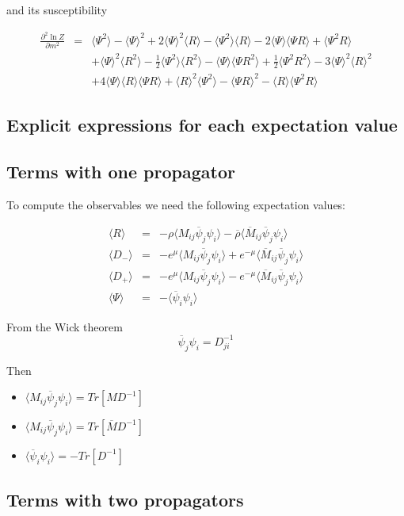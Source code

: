 \documentclass[a4paper,10pt]{report}
\newcommand{\ol}[1]{\overline{#1}}
\newcommand{\rrb}{\overline{\rho}}
\newcommand{\rr}{\rho}
\newcommand{\emu}{e^{\mu}}
\newcommand{\emmu}{e^{-\mu}}
\newcommand{\Mb}{\ol{M}}
\newcommand{\mv}[1]{\langle #1 \rangle}
\newcommand{\pij}[2]{\ol{\psi}_{#1} \psi_{#2}}
\newcommand{\D}{D^{-1}}
\begin{document}
\noindent and its susceptibility

\begin{eqnarray}
\frac{\partial^2 \ln Z}{\partial m^2} &=& 
  \mv{\Psi^2} - \mv{\Psi}^2 + 2 \mv{\Psi}^2\mv{R} - \mv{\Psi^2}\mv{R} 
  - 2 \mv{\Psi}\mv{\Psi R} + \mv{\Psi^2 R} \nonumber \\
  && + \mv{\Psi}^2\mv{R^2} - \frac{1}{2}\mv{\Psi^2}\mv{R^2}
  - \mv{\Psi}\mv{\Psi R^2} + \frac{1}{2}\mv{\Psi^2 R^2} - 3 \mv{\Psi}^2\mv{R}^2 \nonumber \\
  &&  + 4 \mv{\Psi}\mv{R}\mv{\Psi R} 
  + \mv{R}^2\mv{\Psi^2} - \mv{\Psi R}^2 - \mv{R}\mv{\Psi^2 R}
\end{eqnarray}

\subsection*{Explicit expressions for each expectation value}
\subsection*{Terms with one propagator}

To compute the observables we need the following expectation values:

\begin{eqnarray}
\mv{R} &=& - \rr \mv{M_{ij} \pij{j}{i}} - \rrb \mv{\Mb_{ij} \pij{j}{i}}\\
\mv{D_-} &=& - \emu \mv{M_{ij} \pij{j}{i}} + \emmu \mv{\ol{M}_{ij} \pij{j}{i}}\\
\mv{D_+} &=& - \emu \mv{M_{ij} \pij{j}{i}} - \emmu \mv{\ol{M}_{ij} \pij{j}{i}}\\
\mv{\Psi} &=& - \mv{\pij{i}{i}}
\end{eqnarray}

\noindent From the Wick theorem
$$\pij{j}{i} = D^{-1}_{ji}$$

\noindent Then
\begin{itemize}
\item[] $\mv{M_{ij} \pij{j}{i}} = Tr[M\D]$
\item[] $\mv{M_{ij} \pij{j}{i}} = Tr[\Mb\D]$
\item[] $\mv{\pij{i}{i}} = -Tr[\D]$
\end{itemize}


\subsection*{Terms with two propagators}
\end{document}
